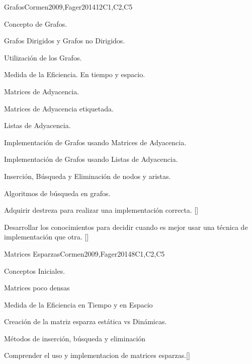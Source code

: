 \begin{syllabus}
\begin{unit}{Grafos}{}{Cormen2009,Fager2014}{12}{C1,C2,C5}
   \begin{topics}
    \item Concepto de Grafos.
    \item Grafos Dirigidos y Grafos no Dirigidos.
    \item Utilización de los Grafos.
    \item Medida de la Eficiencia. En tiempo y espacio.
    \item Matrices de Adyacencia.
    \item Matrices de Adyacencia etiquetada.
    \item Listas de Adyacencia.
    \item Implementación de Grafos usando Matrices de Adyacencia.
    \item Implementación de Grafos usando Listas de Adyacencia.
    \item Inserción, Búsqueda y Eliminación de nodos y aristas.
    \item Algoritmos de búsqueda en grafos.
   \end{topics}
   \begin{learningoutcomes}
      \item  Adquirir destreza para realizar una implementación correcta. [\Usage]
      \item  Desarrollar los conocimientos para decidir cuando es mejor usar una técnica de implementación que otra. [\Usage]   
   \end{learningoutcomes}
\end{unit}

\begin{unit}{Matrices Esparzas}{}{Cormen2009,Fager2014}{8}{C1,C2,C5}
   \begin{topics}
    \item  Conceptos  Iniciales.
    \item  Matrices poco densas
    \item  Medida de la Eficiencia en Tiempo  y en Espacio
    \item  Creación de la matriz esparza estática vs Dinámicas.
    \item  Métodos de inserción, búsqueda y eliminación
   \end{topics}

\begin{learningoutcomes}
      \item Comprender el uso y implementacion de matrices esparzas.[\Assessment]
   \end{learningoutcomes}
\end{unit}


\end{syllabus}
